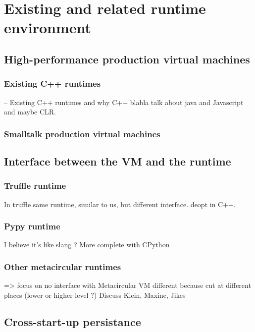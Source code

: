 \documentclass[a4paper,12pt,twoside]{../includes/ThesisStyle}
\begin{document}
\fi

\chapter{Existing and related runtime environment}
\label{chap:comparison}
\minitoc

\section{High-performance production virtual machines}

\subsection{Existing C++ runtimes}
-- Existing C++ runtimes and why C++ blabla
talk about java and Javascript and maybe CLR.

\subsection{Smalltalk production virtual machines}

\section{Interface between the VM and the runtime}

\subsection{Truffle runtime}
In truffle same runtime, similar to us, but different interface. deopt in C++.  

\subsection{Pypy runtime}
I believe it's like slang ? More complete with CPython

\subsection{Other metacircular runtimes}

=> focus on no interface with Metacircular VM
different because cut at different places (lower or higher level ?)
Discuss Klein, Maxine, Jikes

\section{Cross-start-up persistance}
\end{document}
